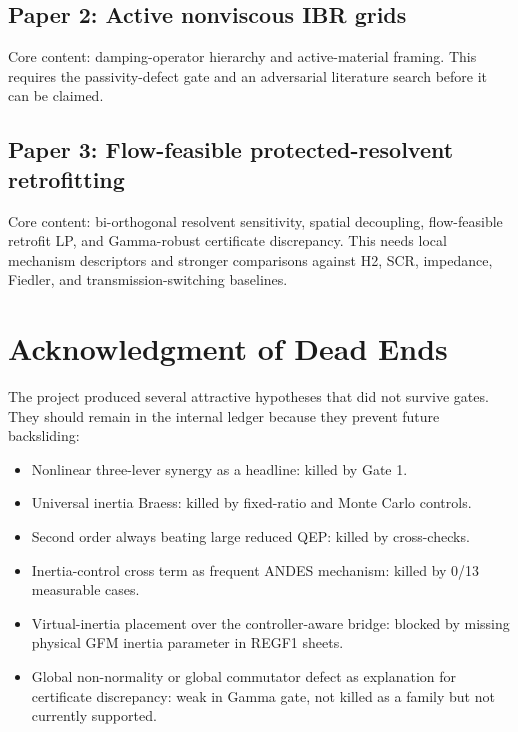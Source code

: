 \documentclass[11pt]{article}
\begin{document}
\subsection*{Paper 2: Active nonviscous IBR grids}
Core content: damping-operator hierarchy and active-material framing. This
requires the passivity-defect gate and an adversarial literature search before
it can be claimed.

\subsection*{Paper 3: Flow-feasible protected-resolvent retrofitting}
Core content: bi-orthogonal resolvent sensitivity, spatial decoupling,
flow-feasible retrofit LP, and Gamma-robust certificate discrepancy. This needs
local mechanism descriptors and stronger comparisons against H2, SCR,
impedance, Fiedler, and transmission-switching baselines.

\section*{Acknowledgment of Dead Ends}

The project produced several attractive hypotheses that did not survive gates.
They should remain in the internal ledger because they prevent future
backsliding:
\begin{itemize}[leftmargin=*]
\item Nonlinear three-lever synergy as a headline: killed by Gate 1.
\item Universal inertia Braess: killed by fixed-ratio and Monte Carlo controls.
\item Second order always beating large reduced QEP: killed by cross-checks.
\item Inertia-control cross term as frequent ANDES mechanism: killed by 0/13
measurable cases.
\item Virtual-inertia placement over the controller-aware bridge: blocked by
missing physical GFM inertia parameter in REGF1 sheets.
\item Global non-normality or global commutator defect as explanation for
certificate discrepancy: weak in Gamma gate, not killed as a family but not
currently supported.
\end{itemize}
\end{document}
